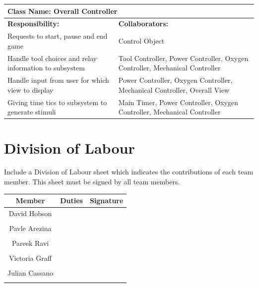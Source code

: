 \documentclass[12pt, titlepage]{article}
\begin{document}
\begin{enumerate}[a)]
	\begin{table}[H]
		\centering
		\begin{tabular}{|p{10cm}|p{5cm}|}
		\hline 
		 \multicolumn{2}{|l|}{\textbf{Class Name: Overall Controller}} \\
		\hline
		\textbf{Responsibility:} & \textbf{Collaborators:} \\
		\hline
		 Requests to start, pause and end game & Control Object \\
		\hline
		 Handle tool choices and relay information to subsystem & Tool Controller, Power Controller, Oxygen Controller, Mechanical Controller\\
		\hline
		 Handle input from user for which view to display & Power Controller, Oxygen Controller, Mechanical Controller, Overall View \\
		\hline
		 Giving time tics to subsystem to generate stimuli & Main Timer, Power Controller, Oxygen Controller, Mechanical Controller \\
		\hline
		\end{tabular}
	\end{table}

\end{enumerate}

\appendix
\section{Division of Labour}
\label{sec:division_of_labour}
Include a Division of Labour sheet which indicates the contributions of each team member. This sheet must be signed by all team members.
\begin{table}[h!]
\centering

\begin{tabular}{|c|c|c|}
\hline
{\bf Member} & {\bf Duties}&{\bf Signature}\\
\hline
{David Hobson} & { } & { }\\
{} & {}  & {}\\
\hline
{Pavle Arezina} & {} & {}\\
{} & {} & {}\\
\hline
{Pareek Ravi} & {} & {}\\
{} & {} & {}\\
\hline
{Victoria Graff} & {} & {}\\
{} & {} & {}\\
\hline
{Julian Cassano} & {} & {}\\
{} & {} & {}\\
\hline
\end{tabular}

\end{table}
\end{document}
